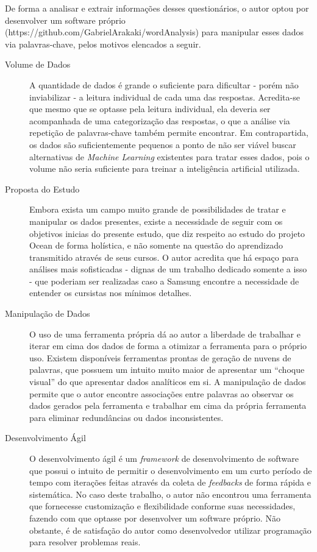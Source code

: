 De forma a analisar e extrair informações desses questionários, o autor optou por desenvolver um software próprio (https://github.com/GabrielArakaki/wordAnalysis) para manipular esses dados via palavras-chave, pelos motivos elencados a seguir.

\begin{description}
\item [Volume de Dados] A quantidade de dados é grande o suficiente para dificultar - porém não inviabilizar - a leitura individual de cada uma das respostas. Acredita-se que mesmo que se optasse pela leitura individual, ela deveria ser acompanhada de uma categorização das respostas, o que a análise via repetição de palavras-chave também permite encontrar. Em contrapartida, os dados são suficientemente pequenos a ponto de não ser viável buscar alternativas  de \textit{Machine Learning} existentes para tratar esses dados, pois o volume não seria suficiente para treinar a inteligência artificial utilizada.

\item [Proposta do Estudo] Embora exista um campo muito grande de possibilidades de tratar e manipular os dados presentes, existe a necessidade de seguir com os objetivos inicias do presente estudo, que diz respeito ao estudo do projeto Ocean de forma holística, e não somente na questão do aprendizado transmitido através de seus cursos. O autor acredita que há espaço para análises mais sofisticadas - dignas de um trabalho dedicado somente a isso - que poderiam ser realizadas caso a Samsung encontre a necessidade de entender os cursistas nos mínimos detalhes.

\item [Manipulação de Dados] O uso de uma ferramenta própria dá ao autor a liberdade de trabalhar e iterar em cima dos dados de forma a otimizar a ferramenta para o próprio uso. Existem disponíveis ferramentas prontas de geração de nuvens de palavras, que possuem um intuito muito maior de apresentar um \enquote{choque visual} do que apresentar dados analíticos em si. A manipulação de dados permite que o autor encontre associações entre palavras ao observar os dados gerados pela ferramenta e trabalhar em cima da própria ferramenta para eliminar redundâncias ou dados inconsistentes.

\item [Desenvolvimento Ágil] O desenvolvimento ágil é um \textit{framework} de desenvolvimento de software que possui o intuito de permitir o desenvolvimento em um curto período de tempo com iterações feitas através da coleta de \textit{feedbacks} de forma rápida e sistemática. No caso deste trabalho, o autor não encontrou uma ferramenta que fornecesse customização e flexibilidade conforme suas necessidades, fazendo com que optasse por desenvolver um software próprio. Não obstante, é de satisfação do autor como desenvolvedor utilizar programação para resolver problemas reais.
 
\end{description}

